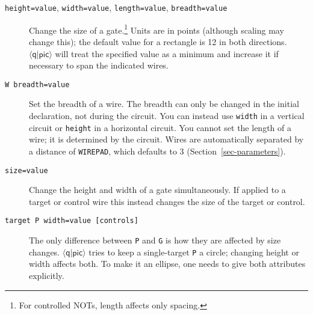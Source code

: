 \documentclass[twoside,12pt]{article}
\newcommand{\qpic}{$\langle\mathsf{q}|\mathsf{pic}\rangle$\xspace}
\begin{document}
\begin{description}
\item[{\tt height=value}, {\tt width=value}, {\tt length=value}, {\tt breadth=value}] Change the size of a gate.\footnote{For controlled NOTs, length affects only spacing.}
Units are in points (although scaling may change this); the default value for a rectangle is 12 in both directions.
\qpic will treat the specified value as a minimum and increase it if necessary to span the indicated wires.

\begin{minipage}[b]{1.8in}

\end{minipage} \hfill  

\begin{minipage}[b]{1.8in}

\end{minipage} \hfill 

\item[{\tt W breadth=value}] Set the breadth of a wire.  The breadth can only be changed in the initial declaration, not during the circuit.  You can instead use {\tt width} in a vertical circuit or {\tt height} in a horizontal circuit.  You cannot set the length of a wire; it is determined by the circuit.
  Wires are automatically separated by a distance of {\tt WIREPAD}, which
  defaults to 3 (Section~\ref{sec-parameters}).

\begin{minipage}[b]{2in}

\end{minipage} \hfill 

\item[{\tt size=value}] Change the height and width of a gate simultaneously.
  If applied to a target or control wire this instead changes the size of
  the target or control.

\begin{minipage}[b]{2in}

\end{minipage} \hfill 
  
\item [{\tt target P width=value [controls]}] The only difference between
  {\tt P} and {\tt G} is how they are affected by size changes.
  \qpic tries to keep a single-target {\tt P} a circle; changing height or width
  affects both.  To make it an ellipse, one needs to give both
  attributes explicitly.

\begin{minipage}[b]{2in}

\end{minipage} \hfill 

  
\end{description}
\end{document}

